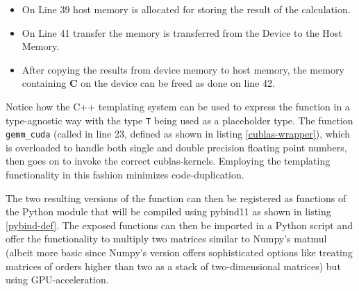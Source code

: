 \documentclass[english,11pt,a4paper,table]{article} %
\begin{document}

\begin{itemize}
	\item On Line 39  host memory is allocated for storing the result of the calculation.
	\item On Line 41 transfer the memory is transferred from the Device to the Host Memory.
	\item After copying the results from device memory to host memory, the memory containing $\mathbf{C}$ on the device can be freed as done on line 42.
\end{itemize}

Notice how the C++ templating system can be used to express the function in a type-agnostic way with the type \texttt{T} being used as a placeholder type. The function \texttt{gemm\_cuda} (called in line 23, defined as shown in listing \ref{cublas-wrapper}), which is overloaded to handle both single and double precision floating point numbers, then goes on to invoke the correct cublas-kernels.
Employing the templating functionality in this fashion minimizes code-duplication.

The two resulting versions of the function can then be registered as functions of the Python module that will be compiled using pybind11 as shown in listing \ref{pybind-def}. The exposed functions can then be imported in a Python script and offer the functionality to multiply two matrices similar to Numpy's matmul (albeit more basic since Numpy's version offers sophisticated options like treating matrices of orders higher than two as a stack of two-dimensional matrices) but using GPU-acceleration.
\end{document}
